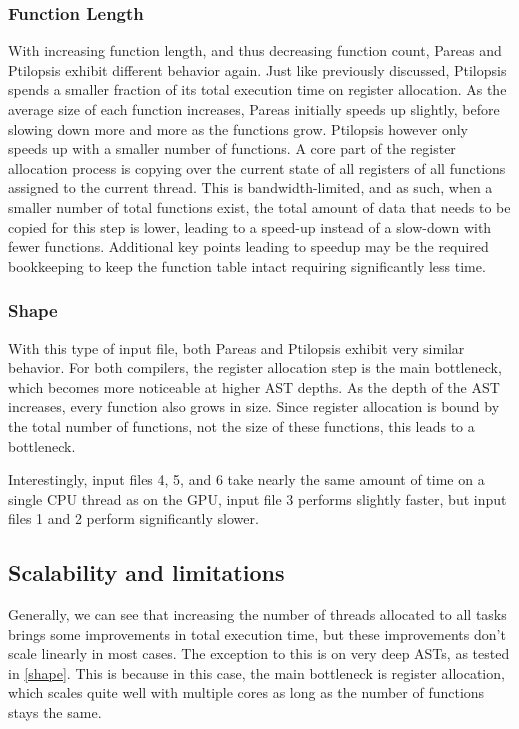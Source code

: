 \documentclass[12pt,dvipsnames]{article}
\begin{document}
\subsubsection*{Function Length}
With increasing function length, and thus decreasing function count, Pareas and Ptilopsis exhibit different behavior again. Just like previously discussed, Ptilopsis spends a smaller fraction of its total execution time on register allocation. As the average size of each function increases, Pareas initially speeds up slightly, before slowing down more and more as the functions grow. Ptilopsis however only speeds up with a smaller number of functions. A core part of the register allocation process is copying over the current state of all registers of all functions assigned to the current thread. This is bandwidth-limited, and as such, when a smaller number of total functions exist, the total amount of data that needs to be copied for this step is lower, leading to a speed-up instead of a slow-down with fewer functions. Additional key points leading to speedup may be the required bookkeeping to keep the function table intact requiring significantly less time.

\subsubsection*{Shape}
With this type of input file, both Pareas and Ptilopsis exhibit very similar behavior. For both compilers, the register allocation step is the main bottleneck, which becomes more noticeable at higher AST depths. As the depth of the AST increases, every function also grows in size. Since register allocation is bound by the total number of functions, not the size of these functions, this leads to a bottleneck.

Interestingly, input files 4, 5, and 6 take nearly the same amount of time on a single CPU thread as on the GPU, input file 3 performs slightly faster, but input files 1 and 2 perform significantly slower.

\subsection{Scalability and limitations}
Generally, we can see that increasing the number of threads allocated to all tasks brings some improvements in total execution time, but these improvements don't scale linearly in most cases. The exception to this is on very deep ASTs, as tested in \autoref{shape}. This is because in this case, the main bottleneck is register allocation, which scales quite well with multiple cores as long as the number of functions stays the same.
\end{document}
